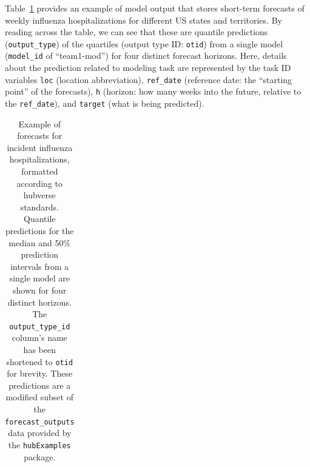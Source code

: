 \documentclass[
]{article}
\begin{document}
Table~\ref{tbl-example-forecasts} provides an example of model output
that stores short-term forecasts of weekly influenza hospitalizations
for different US states and territories. By reading across the table, we
can see that these are quantile predictions (\texttt{output\_type}) of
the quartiles (output type ID: \texttt{otid}) from a single model
(\texttt{model\_id} of ``team1-mod'') for four distinct forecast
horizons. Here, details about the prediction related to modeling task
are represented by the task ID variables \texttt{loc} (location
abbreviation), \texttt{ref\_date} (reference date: the ``starting
point'' of the forecasts), \texttt{h} (horizon: how many weeks into the
future, relative to the \texttt{ref\_date}), and \texttt{target} (what
is being predicted).

\begin{longtable}[]{@{}
  >{\raggedright\arraybackslash}p{}
  >{\raggedright\arraybackslash}p{}
  >{\raggedright\arraybackslash}p{}
  >{\raggedleft\arraybackslash}p{}
  >{\raggedright\arraybackslash}p{}
  >{\raggedright\arraybackslash}p{}
  >{\raggedright\arraybackslash}p{}
  >{\raggedleft\arraybackslash}p{}@{}}

\caption{\label{tbl-example-forecasts}Example of forecasts for incident
influenza hospitalizations, formatted according to hubverse standards.
Quantile predictions for the median and 50\% prediction intervals from a
single model are shown for four distinct horizons. The
\texttt{output\_type\_id} column's name has been shortened to
\texttt{otid} for brevity. These predictions are a modified subset of
the \texttt{forecast\_outputs} data provided by the \texttt{hubExamples}
package.}

\tabularnewline


\end{longtable}
\end{document}
